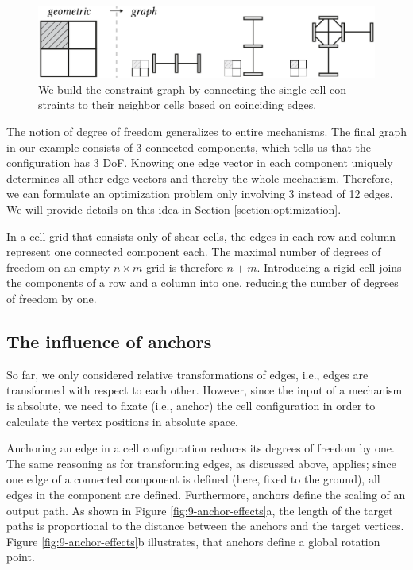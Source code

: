 \begin{figure} [h]
    \includegraphics[width=\textwidth]{chapters/understanding-metamaterial-mechanisms-FIG/8-constraint-graph.png}
    \caption[Short figure name.]{We build the constraint graph by connecting the single cell con-straints to their neighbor cells based on coinciding edges. 
    \label{fig:8-constraint-graph}}
\end{figure}

The notion of degree of freedom generalizes to entire mechanisms. The final graph in our example consists of 3 connected components, which tells us that the configuration has 3 DoF. Knowing one edge vector in each component uniquely determines all other edge vectors and thereby the whole mechanism. Therefore, we can formulate an optimization problem only involving 3 instead of 12 edges. We will provide details on this idea in Section \ref{section:optimization}. 

In a cell grid that consists only of shear cells, the edges in each row and column represent one connected component each. The maximal number of degrees of freedom on an empty $n \times m$ grid is therefore $n+m$. Introducing a rigid cell joins the components of a row and a column into one, reducing the number of degrees of freedom by one.


\subsection{The influence of anchors}

So far, we only considered relative transformations of edges, i.e., edges are transformed with respect to each other. However, since the input of a mechanism is absolute, we need to fixate (i.e., anchor) the cell configuration in order to calculate the vertex positions in absolute space. 

Anchoring an edge in a cell configuration reduces its degrees of freedom by one. The same reasoning as for transforming edges, as discussed above, applies; since one edge of a connected component is defined (here, fixed to the ground), all edges in the component are defined. Furthermore, anchors define the scaling of an output path. As shown in Figure \ref{fig:9-anchor-effects}a, the length of the target paths is proportional to the distance between the anchors and the target vertices. Figure \ref{fig:9-anchor-effects}b illustrates, that anchors define a global rotation point.

